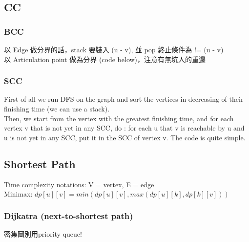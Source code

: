 \documentclass[10pt,oneside]{article}
\begin{document}
\begin{landscape}
\begin{multicols}{2}
\subsection{CC}

\subsubsection{BCC}
以 Edge 做分界的話，stack 要裝入 (u - v), 並 pop 終止條件為 != (u - v) \\
以 Articulation point 做為分界 (code below)，注意有無坑人的重邊

\subsubsection{SCC}

First of all we run DFS on the graph and sort the vertices in decreasing of their finishing time (we can use a stack).\\
Then, we start from the vertex with the greatest finishing time, and for each vertex v that is not yet in any SCC, do : for each u that v is reachable by u and u is not yet in any SCC, put it in the SCC of vertex v. The code is quite simple.


\subsection{Shortest Path}

Time complexity notations: V = vertex, E = edge \\
Minimax: $dp[u][v] = min(dp[u][v], max(dp[u][k], dp[k][v]))$ \\



\subsubsection{Dijkatra (next-to-shortest path)}
密集圖別用priority queue!


\end{multicols}
\end{landscape}
\end{document}
